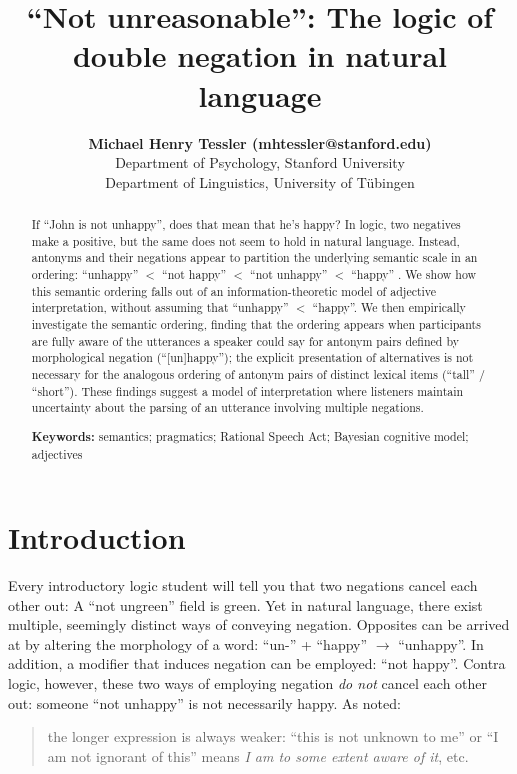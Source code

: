 \documentclass[10pt,letterpaper]{article}
\title{``Not unreasonable'': The logic of double negation in natural language}
\author{{\large \bf Michael Henry Tessler (mhtessler@stanford.edu)} \\
  Department of Psychology, Stanford University 
  \AND {\large \bf Michael Franke (mchfranke@gmail.com)} \\
  Department of Linguistics, University of T\"{u}bingen}
\begin{document}
\maketitle


\begin{abstract}

If ``John is not unhappy'', does that mean that he's happy? 
In logic, two negatives make a positive, but the same does not seem to hold in natural language. 
Instead, antonyms and their negations appear to partition the underlying semantic scale in an ordering: ``unhappy'' $<$ ``not happy'' $<$ ``not unhappy'' $<$ ``happy'' \cite{Horn1989:Natural, Krifka2007:Negated-antonyms}. 
We show how this semantic ordering falls out of an information-theoretic model of adjective interpretation, without assuming that ``unhappy'' $<$ ``happy''.
We then empirically investigate the semantic ordering, finding that the ordering appears when participants are fully aware of the utterances a speaker could say for antonym pairs defined by morphological negation (``[un]happy''); the explicit presentation of alternatives is not necessary for the analogous ordering of antonym pairs of distinct lexical items (``tall'' / ``short''). 
These findings suggest a model of interpretation where listeners maintain uncertainty about the parsing of an utterance involving multiple negations.


\textbf{Keywords:} 
semantics; pragmatics; Rational Speech Act; Bayesian cognitive model; adjectives
\end{abstract}


\section{Introduction}

Every introductory logic student will tell you that two negations cancel each other out: A ``not ungreen'' field is green.
Yet in natural language, there exist multiple, seemingly distinct ways of conveying negation.  
Opposites can be arrived at by altering the morphology of a word: ``un-'' + ``happy'' $\rightarrow$ ``unhappy''.
In addition, a modifier that induces negation can be employed: ``not happy''.
Contra logic, however, these two ways of employing negation \emph{do not} cancel each other out: someone ``not unhappy'' is not necessarily happy. 	
As  noted:
%
\begin{quote}
the longer expression is always weaker: ``this is not unknown to me'' or ``I am not ignorant of this'' means \emph{I am to some extent aware of it}, etc.
\end{quote}
%
\end{document}
